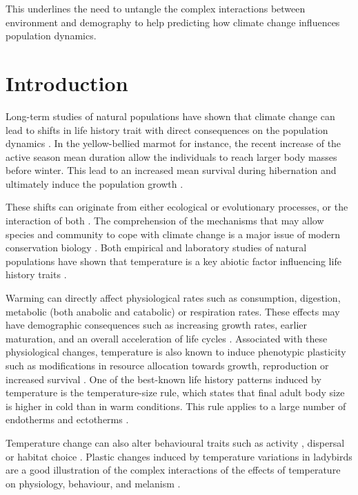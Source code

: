 This underlines the need to untangle the complex interactions between
environment and demography to help predicting how climate change influences
population dynamics.


\section{Introduction}

Long-term studies of natural populations have shown that climate change can lead
to shifts in life history trait with direct consequences on the population
dynamics \autocites{parmesan2006a,ozgul2009a,ozgul2010coupled}.
In the yellow-bellied marmot for instance, the recent increase of the active season mean duration allow the
individuals to reach larger body masses before winter. This lead to an increased
mean survival during hibernation and ultimately induce the population growth
\autocites{ozgul2010coupled}.

These shifts can originate from either ecological or evolutionary processes, or
the interaction of both
\autocites{ozgul2009a,pelletier2007evolutionary,kokko2007a,saccheri2006natural}.
The comprehension of the mechanisms that may allow species and community to cope
with climate change is a major issue of modern conservation biology
\autocites{lavergne2010a}. Both empirical and laboratory studies of
natural populations \autocites{edeline2013a,atkinson1996a}
have shown that temperature is a key abiotic factor influencing life history
traits \autocites{gillooly2001a}.

Warming can directly affect physiological rates such as consumption, digestion,
metabolic (both anabolic and catabolic) or respiration rates. These effects may
have demographic consequences such as increasing growth rates, earlier
maturation, and an overall acceleration of life cycles
\autocites{gillooly2002a,le-galliard2012a}. Associated with these physiological
changes, temperature is also known to induce phenotypic plasticity such as
modifications in resource allocation towards growth, reproduction or increased
survival
\autocites{liefting2010temperature,hallsson2012selection,gutteling2007mapping}.
One of the best-known life history patterns induced by temperature is the
temperature-size rule, which states that final adult body size is higher in cold
than in warm conditions.
This rule applies to a large number of endotherms and ectotherms
\autocites{atkinson1994a,atkinson1996a,angilletta2009a,walters2006temperature,daufresne2009global}.

Temperature change can also alter behavioural traits such as activity
\autocites{atacho2013a,seebacher2005review}, dispersal
\autocites{bonte2008thermal} or habitat choice
\autocites{vanbeest2012temperature}. Plastic changes induced by temperature
variations in ladybirds are a good illustration of the complex interactions of
the effects of temperature on physiology, behaviour, and melanism
\autocites{michie2010melanic}.

